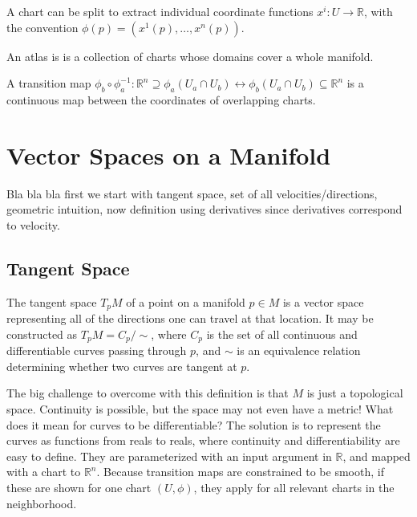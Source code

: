 A chart can be split to extract individual coordinate functions $x^{i}: U \rightarrow \mathbb{R}$, with the convention $\phi(p) = (x^{1}(p), \dots, x^{n}(p))$.

\begin{definition}[Atlas]
	An atlas is is a collection of charts whose domains cover a whole manifold.
\end{definition}

\begin{definition}
	A transition map $\phi_{b} \circ \phi_{a}^{-1}: \mathbb{R}^{n} \supseteq \phi_{a}(U_{a} \cap U_{b}) \leftrightarrow \phi_{b}(U_{a} \cap U_{b}) \subseteq \mathbb{R}^{n}$ is a continuous map between the coordinates of overlapping charts.
\end{definition}

\section{Vector Spaces on a Manifold}

Bla bla bla first we start with tangent space, set of all velocities/directions, geometric intuition, now definition using derivatives since derivatives correspond to velocity.

\subsection{Tangent Space}

\begin{definition}
	The tangent space $T_{p}M$ of a point on a manifold $p \in M$ is a vector space representing all of the directions one can travel at that location. It may be constructed as $T_{p}M = C_{p} / \sim$, where $C_{p}$ is the set of all continuous and differentiable curves passing through $p$, and $\sim$ is an equivalence relation determining whether two curves are tangent at $p$.
\end{definition}

The big challenge to overcome with this definition is that $M$ is just a topological space. Continuity is possible, but the space may not even have a metric! What does it mean for curves to be differentiable? The solution is to represent the curves as functions from reals to reals, where continuity and differentiability are easy to define. They are parameterized with an input argument in $\mathbb{R}$, and mapped with a chart to $\mathbb{R}^{n}$. Because transition maps are constrained to be smooth, if these are shown for one chart $(U, \phi)$, they apply for all relevant charts in the neighborhood.

